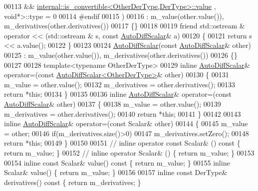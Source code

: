 \begin{DoxyCode}
00113         &&  \hyperlink{struct_eigen_1_1internal_1_1is__convertible}{internal::is\_convertible<OtherDerType,DerType>::value}
       , \textcolor{keywordtype}{void}*>::type = 0
00114 #endif
00115     )
00116       : m\_value(other.value()), m\_derivatives(other.derivatives())
00117     \{\}
00118 
00119     \textcolor{keyword}{friend}  std::ostream & operator << (std::ostream & s, \textcolor{keyword}{const} \hyperlink{class_eigen_1_1_auto_diff_scalar}{AutoDiffScalar}& a)
00120     \{
00121       \textcolor{keywordflow}{return} s << a.value();
00122     \}
00123 
00124     \hyperlink{class_eigen_1_1_auto_diff_scalar}{AutoDiffScalar}(\textcolor{keyword}{const} \hyperlink{class_eigen_1_1_auto_diff_scalar}{AutoDiffScalar}& other)
00125       : m\_value(other.value()), m\_derivatives(other.derivatives())
00126     \{\}
00127 
00128     \textcolor{keyword}{template}<\textcolor{keyword}{typename} OtherDerType>
00129     \textcolor{keyword}{inline} \hyperlink{class_eigen_1_1_auto_diff_scalar}{AutoDiffScalar}& operator=(\textcolor{keyword}{const} 
      \hyperlink{class_eigen_1_1_auto_diff_scalar}{AutoDiffScalar<OtherDerType>}& other)
00130     \{
00131       m\_value = other.value();
00132       m\_derivatives = other.derivatives();
00133       \textcolor{keywordflow}{return} *\textcolor{keyword}{this};
00134     \}
00135 
00136     \textcolor{keyword}{inline} \hyperlink{class_eigen_1_1_auto_diff_scalar}{AutoDiffScalar}& operator=(\textcolor{keyword}{const} \hyperlink{class_eigen_1_1_auto_diff_scalar}{AutoDiffScalar}& other)
00137     \{
00138       m\_value = other.value();
00139       m\_derivatives = other.derivatives();
00140       \textcolor{keywordflow}{return} *\textcolor{keyword}{this};
00141     \}
00142 
00143     \textcolor{keyword}{inline} \hyperlink{class_eigen_1_1_auto_diff_scalar}{AutoDiffScalar}& operator=(\textcolor{keyword}{const} Scalar& other)
00144     \{
00145       m\_value = other;
00146       \textcolor{keywordflow}{if}(m\_derivatives.size()>0)
00147         m\_derivatives.setZero();
00148       \textcolor{keywordflow}{return} *\textcolor{keyword}{this};
00149     \}
00150 
00151 \textcolor{comment}{//     inline operator const Scalar& () const \{ return m\_value; \}}
00152 \textcolor{comment}{//     inline operator Scalar& () \{ return m\_value; \}}
00153 
00154     \textcolor{keyword}{inline} \textcolor{keyword}{const} Scalar& value()\textcolor{keyword}{ const }\{ \textcolor{keywordflow}{return} m\_value; \}
00155     \textcolor{keyword}{inline} Scalar& value() \{ \textcolor{keywordflow}{return} m\_value; \}
00156 
00157     \textcolor{keyword}{inline} \textcolor{keyword}{const} DerType& derivatives()\textcolor{keyword}{ const }\{ \textcolor{keywordflow}{return} m\_derivatives; \}

\end{DoxyCode}

